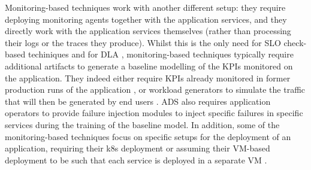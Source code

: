 Monitoring-based techniques work with another different setup: they require deploying monitoring agents together with the application services, and they directly work with the application services themselves (rather than processing their logs or the traces they produce).
Whilst this is the only need for SLO check-based techiniques \cite{40_Chen2020_CauseInfer,48_Chen2014_CauseInfer,49_Shan2019_epsilonDiagnosis} and for DLA \cite{14_Samir2019_DLA}, monitoring-based techniques typically require additional artifacts to generate a baseline modelling of the KPIs monitored on the application.
They indeed either require KPIs already monitored in former production runs of the application \cite{29_Wang2018_CloudRanger}, or workload generators to simulate the traffic that will then be generated by end users \cite{37_Gulenko2018_DetectingAnomalousBehaviourBlackBoxServices,04_Wu2020_MicroRCA,09_Wu2020_MicroserviceDiagnosisDeepLearning,33_Mariani2020_PredictingFailures,15_Du2018_AnomalyDetectionContainerMicroservices}.
ADS \cite{15_Du2018_AnomalyDetectionContainerMicroservices} also requires application operators to provide failure injection modules to inject specific failures in specific services during the training of the baseline model. 
In addition, some of the monitoring-based techniques focus on specific setups for the deployment of an application, \eg requiring their k8s deployment \cite{49_Shan2019_epsilonDiagnosis,04_Wu2020_MicroRCA,09_Wu2020_MicroserviceDiagnosisDeepLearning,14_Samir2019_DLA,06_Lin2018_Microscope,19_Guan2019_MicroscopeDemo} or assuming their VM-based deployment to be such that each service is deployed in a separate VM \cite{33_Mariani2020_PredictingFailures}.



